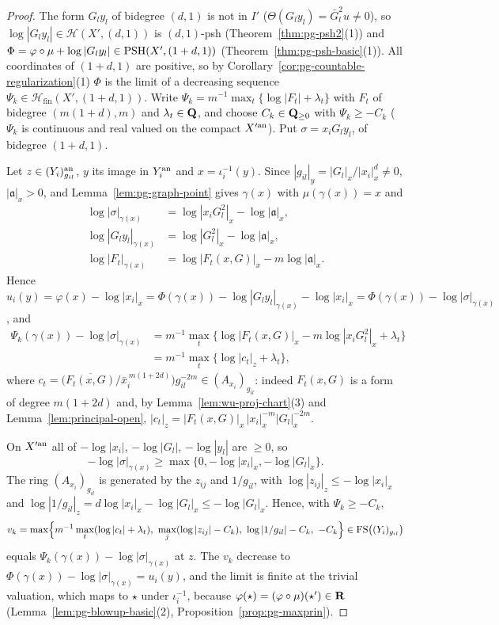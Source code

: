 \begin{proof}
The form $G_ly_l$ of bidegree $(d,1)$ is not in $I'$ ($\Theta(G_ly_l)=\bar G_l^2u\ne0$), so $\log|G_ly_l|\in\mathcal H(X',(d,1))$ is $(d,1)$-psh
(Theorem~\ref{thm:pg-psh2}(1)) and $\Phi=\varphi\circ\mu+\log|G_ly_l|\in\operatorname{PSH}(X',(1+d,1))$ (Theorem~\ref{thm:pg-psh-basic}(1)). All coordinates of $(1+d,1)$ are
positive, so by Corollary~\ref{cor:pg-countable-regularization}(1) $\Phi$ is the limit of a decreasing sequence $\Psi_k\in\mathcal H_{\mathrm{fin}}(X',(1+d,1))$.
Write $\Psi_k=m^{-1}\max_t\{\log|F_t|+\lambda_t\}$ with $F_t$ of bidegree $(m(1+d),m)$ and $\lambda_t\in\mathbf{Q}$, and choose $C_k\in\mathbf{Q}_{\ge0}$ with $\Psi_k\ge-C_k$
($\Psi_k$ is continuous and real valued on the compact $X'^{\mathrm{an}}$). Put $\sigma=x_iG_ly_l$, of bidegree $(1+d,1)$.

Let $z\in(Y_i)_{g_{il}}^{\mathrm{an}}$, $y$ its image in $Y_i^{\mathrm{an}}$ and $x=\iota_i^{-1}(y)$. Since $|g_{il}|_y=|G_l|_x/|x_i|_x^d\ne0$, $|\mathfrak a|_x>0$, and
Lemma~\ref{lem:pg-graph-point} gives $\gamma(x)$ with $\mu(\gamma(x))=x$ and
\[
\begin{aligned}
\log|\sigma|_{\gamma(x)}&=\log|x_iG_l^2|_x-\log|\mathfrak a|_x,\\
\log|G_ly_l|_{\gamma(x)}&=\log|G_l^2|_x-\log|\mathfrak a|_x,\\
\log|F_t|_{\gamma(x)}&=\log|F_t(x,G)|_x-m\log|\mathfrak a|_x .
\end{aligned}
\]
Hence $u_i(y)=\varphi(x)-\log|x_i|_x=\Phi(\gamma(x))-\log|G_ly_l|_{\gamma(x)}-\log|x_i|_x=\Phi(\gamma(x))-\log|\sigma|_{\gamma(x)}$, and
\[
\begin{aligned}
\Psi_k(\gamma(x))-\log|\sigma|_{\gamma(x)}
 &=m^{-1}\max_t\{\log|F_t(x,G)|_x-m\log|x_iG_l^2|_x+\lambda_t\}\\
 &=m^{-1}\max_t\{\log|c_t|_z+\lambda_t\},
\end{aligned}
\]
where $c_t=\bigl(\overline{F_t(x,G)}/\bar x_i^{\,m(1+2d)}\bigr)g_{il}^{-2m}\in(A_{x_i})_{g_{il}}$: indeed $F_t(x,G)$ is a form of degree $m(1+2d)$ and,
by Lemma~\ref{lem:wu-proj-chart}(3) and Lemma~\ref{lem:principal-open}, $|c_t|_z=|F_t(x,G)|_x\,|x_i|_x^{-m}|G_l|_x^{-2m}$.

On $X'^{\mathrm{an}}$ all of $-\log|x_i|$, $-\log|G_l|$, $-\log|y_l|$ are $\ge0$, so
\[
-\log|\sigma|_{\gamma(x)}\ge\max\{0,-\log|x_i|_x,-\log|G_l|_x\}.
\]
The ring
$(A_{x_i})_{g_{il}}$ is generated by the $z_{ij}$ and $1/g_{il}$, with $\log|z_{ij}|_z\le-\log|x_i|_x$ and
$\log|1/g_{il}|_z=d\log|x_i|_x-\log|G_l|_x\le-\log|G_l|_x$. Hence, with $\Psi_k\ge-C_k$,
\[
v_k=\max\Bigl\{m^{-1}\max_t(\log|c_t|+\lambda_t),\ \max_j(\log|z_{ij}|-C_k),\ \log|1/g_{il}|-C_k,\ -C_k\Bigr\}\in\FS\bigl((Y_i)_{g_{il}}\bigr)
\]
equals $\Psi_k(\gamma(x))-\log|\sigma|_{\gamma(x)}$ at $z$. The $v_k$ decrease to $\Phi(\gamma(x))-\log|\sigma|_{\gamma(x)}=u_i(y)$, and the limit is
finite at the trivial valuation, which maps to $\star$ under $\iota_i^{-1}$, because $\varphi(\star)=(\varphi\circ\mu)(\star')\in\mathbf{R}$
(Lemma~\ref{lem:pg-blowup-basic}(2), Proposition~\ref{prop:pg-maxprin}).
\end{proof}

